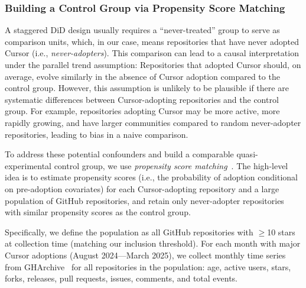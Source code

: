 \subsubsection{Building a Control Group via Propensity Score Matching}
\label{sec:matching}

A staggered DiD design usually requires a ``never-treated'' group to serve as comparison units, which, in our case, means repositories that have never adopted Cursor (i.e., \emph{never-adopters}).
This comparison can lead to a causal interpretation under the parallel trend assumption: Repositories that adopted Cursor should, on average, evolve similarly in the absence of Cursor adoption compared to the control group.
However, this assumption is unlikely to be plausible if there are systematic differences between Cursor-adopting repositories and the control group.
For example, repositories adopting Cursor may be more active, more rapidly growing, and have larger communities compared to random never-adopter repositories, leading to bias in a naive comparison.

To address these potential confounders and build a comparable quasi-experimental control group, we use \emph{propensity score matching}~\cite{caliendo2008some, austin2011introduction}. %
The high-level idea is to estimate propensity scores (i.e., the probability of adoption conditional on pre-adoption covariates) for each Cursor-adopting repository and a large population of GitHub repositories, and retain only never-adopter repositories with similar propensity scores as the control group. 

Specifically, we define the population as all GitHub repositories with $\geq$10 stars at collection time (matching our inclusion threshold). For each month with major Cursor adoptions (August 2024---March 2025), we collect monthly time series from GHArchive~\cite{gharchive} for all repositories in the population: age, active users, stars, forks, releases, pull requests, issues, comments, and total events.

